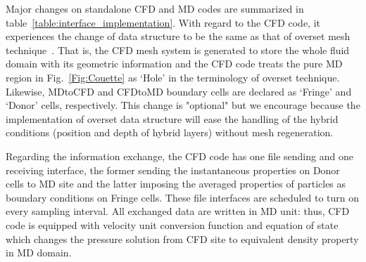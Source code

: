 \documentclass[preprint,12pt]{elsarticle}
\begin{document}
Major changes on standalone CFD and MD codes are summarized in table~\ref{table:interface_implementation}. With regard to the CFD code, it experiences the change of data structure to be the same as that of overset mesh technique~\cite{Chimera}. That is, the CFD mesh system is generated to store the whole fluid domain with its geometric information and the CFD code treats the pure MD region in Fig.~\ref{Fig:Couette} as `Hole' in the terminology of overset technique. Likewise, MDtoCFD and CFDtoMD boundary cells are declared as `Fringe' and `Donor' cells, respectively. This change is "optional" but we encourage because the implementation of overset data structure will ease the handling of the hybrid conditions (position and depth of hybrid layers) without mesh regeneration.

Regarding the information exchange, the CFD code has one file sending and one receiving interface, the former sending the instantaneous properties on Donor cells to MD site and the latter imposing the averaged properties of particles as boundary conditions on Fringe cells. These file interfaces are scheduled to turn on every sampling interval. All exchanged data are written in MD unit: thus, CFD code is equipped with velocity unit conversion function and equation of state which changes the pressure solution from CFD site to equivalent density property in MD domain.


\end{document}

